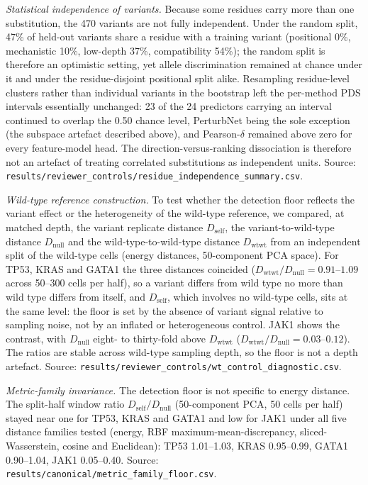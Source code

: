 \documentclass[11pt,letterpaper]{article}
\begin{document}
\smallskip
\noindent\textit{Statistical independence of variants.} Because some residues carry more than one substitution, the 470 variants are not fully independent. Under the random split, 47\% of held-out variants share a residue with a training variant (positional 0\%, mechanistic 10\%, low-depth 37\%, compatibility 54\%); the random split is therefore an optimistic setting, yet allele discrimination remained at chance under it and under the residue-disjoint positional split alike. Resampling residue-level clusters rather than individual variants in the bootstrap left the per-method PDS intervals essentially unchanged: 23 of the 24 predictors carrying an interval continued to overlap the 0.50 chance level, PerturbNet being the sole exception (the subspace artefact described above), and Pearson-$\delta$ remained above zero for every feature-model head. The direction-versus-ranking dissociation is therefore not an artefact of treating correlated substitutions as independent units. Source: \texttt{results/reviewer\_controls/residue\_independence\_summary.csv}.

\smallskip
\noindent\textit{Wild-type reference construction.} To test whether the detection floor reflects the variant effect or the heterogeneity of the wild-type reference, we compared, at matched depth, the variant replicate distance $D_{\mathrm{self}}$, the variant-to-wild-type distance $D_{\mathrm{null}}$ and the wild-type-to-wild-type distance $D_{\mathrm{wtwt}}$ from an independent split of the wild-type cells (energy distances, 50-component PCA space). For TP53, KRAS and GATA1 the three distances coincided ($D_{\mathrm{wtwt}}/D_{\mathrm{null}} = 0.91$--$1.09$ across 50--300 cells per half), so a variant differs from wild type no more than wild type differs from itself, and $D_{\mathrm{self}}$, which involves no wild-type cells, sits at the same level: the floor is set by the absence of variant signal relative to sampling noise, not by an inflated or heterogeneous control. JAK1 shows the contrast, with $D_{\mathrm{null}}$ eight- to thirty-fold above $D_{\mathrm{wtwt}}$ ($D_{\mathrm{wtwt}}/D_{\mathrm{null}} = 0.03$--$0.12$). The ratios are stable across wild-type sampling depth, so the floor is not a depth artefact. Source: \texttt{results/reviewer\_controls/wt\_control\_diagnostic.csv}.

\smallskip
\noindent\textit{Metric-family invariance.} The detection floor is not specific to energy distance. The split-half window ratio $D_\mathrm{self}/D_\mathrm{null}$ (50-component PCA, 50 cells per half) stayed near one for TP53, KRAS and GATA1 and low for JAK1 under all five distance families tested (energy, RBF maximum-mean-discrepancy, sliced-Wasserstein, cosine and Euclidean): TP53 1.01--1.03, KRAS 0.95--0.99, GATA1 0.90--1.04, JAK1 0.05--0.40. Source: \texttt{results/canonical/metric\_family\_floor.csv}.
\end{document}
